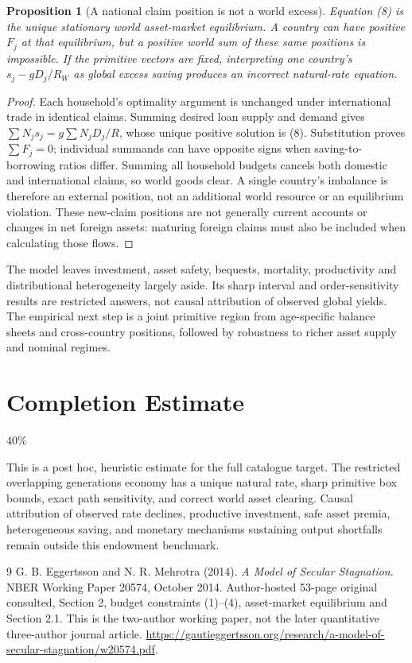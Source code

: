 \documentclass[11pt]{article}
\newtheorem{proposition}[theorem]{Proposition}
\theoremstyle{remark}
\begin{document}
\begin{proposition}[A national claim position is not a world excess]
Equation (8) is the unique stationary world asset-market equilibrium.
A country can have positive $F_j$ at that equilibrium, but a positive
world sum of these same positions is impossible. If the primitive vectors
are fixed, interpreting one country's $s_j-gD_j/R_W$ as global excess
saving produces an incorrect natural-rate equation.
\end{proposition}
\begin{proof}
Each household's optimality argument is unchanged under international
trade in identical claims. Summing desired loan supply and demand gives
$\sum N_js_j=g\sum N_jD_j/R$, whose unique positive solution is
(8). Substitution proves $\sum F_j=0$; individual summands can have
opposite signs when saving-to-borrowing ratios differ. Summing all household
budgets cancels both domestic and international claims, so world goods
clear. A single country's imbalance is therefore an external position,
not an additional world resource or an equilibrium violation.
These new-claim positions are not generally current accounts or changes
in net foreign assets: maturing foreign claims must also be included
when calculating those flows.
\end{proof}
The model leaves investment, asset safety, bequests, mortality, productivity
and distributional heterogeneity largely aside. Its sharp interval and
order-sensitivity results are restricted answers, not causal attribution
of observed global yields. The empirical next step is a joint primitive
region from age-specific balance sheets and cross-country positions,
followed by robustness to richer asset supply and nominal regimes.

\section{Completion Estimate}
40\%

This is a post hoc, heuristic estimate for the full catalogue target.
The restricted overlapping generations economy has a unique natural rate, sharp primitive box bounds, exact path sensitivity, and correct world asset clearing. Causal attribution of observed rate declines, productive investment, safe asset premia, heterogeneous saving, and monetary mechanisms sustaining output shortfalls remain outside this endowment benchmark.

\begin{thebibliography}{9}
 G. B. Eggertsson and N. R. Mehrotra (2014).
\emph{A Model of Secular Stagnation}. NBER Working Paper 20574,
October 2014. Author-hosted 53-page original consulted, Section 2,
budget constraints (1)--(4), asset-market equilibrium and Section 2.1.
This is the two-author working paper, not the later quantitative
three-author journal article.
\url{https://gautieggertsson.org/research/a-model-of-secular-stagnation/w20574.pdf}.
\end{thebibliography}
\end{document}
